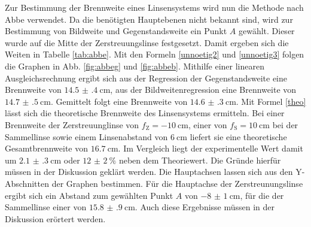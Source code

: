 Zur Bestimmung der Brennweite eines Linsensystems wird nun die Methode nach Abbe verwendet. Da die benötigten Hauptebenen nicht bekannt sind, wird zur Bestimmung von Bildweite und Gegenstandsweite ein Punkt $A$ gewählt. Dieser wurde auf die Mitte der Zerstreuungslinse festgesetzt. Damit ergeben sich die Weiten in Tabelle \ref{tab:abbe}. Mit den Formeln \eqref{unnoetig2} und \eqref{unnoetig3} folgen die Graphen in Abb. \ref{fig:abbeg} und \ref{fig:abbeb}. Mithilfe einer linearen Ausgleichsrechnung ergibt sich aus der Regression der Gegenstandsweite eine Brennweite von $\SI{14.5(4)}{\centi\meter}$, aus der Bildweitenregression eine Brennweite von $\SI{14.7(5)}{\centi\meter}$.
Gemittelt folgt eine Brennweite von $\SI{14.6(3)}{\centi\meter}$. Mit Formel \eqref{theo} lässt sich die theoretische Brennweite des Linsensystems ermitteln.
Bei einer Brennweite der Zerstreuunglinse von $f_\text{Z} = \SI{-10}{\centi\meter}$, einer von $f_\text{S} = \SI{10}{\centi\meter}$ bei der Sammellinse sowie einem Linsenabstand von $\SI{6}{\centi\meter}$ liefert sie eine theoretische Gesamtbrennweite von $\SI{16.7}{\centi\meter}$. Im Vergleich liegt der experimentelle Wert damit um $\SI{2.1(3)}{\centi\meter}$ oder $\SI{12(2)}{\percent}$ neben dem Theoriewert. Die Gründe hierfür müssen in der Diskussion geklärt werden.
 Die Hauptachsen lassen sich aus den Y-Abschnitten der Graphen bestimmen.
 Für die Hauptachse der Zerstreunungslinse ergibt sich ein Abstand zum gewählten Punkt $A$ von $\SI{-8(1)}{\centi\meter}$, für die der Sammellinse einer von $\SI{15.8(9)}{\centi\meter}$. Auch diese Ergebnisse müssen in der Diskussion erörtert werden.
